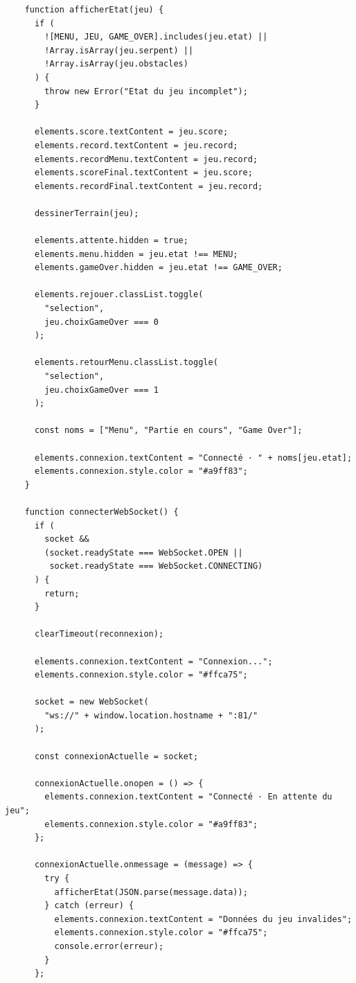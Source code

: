 \documentclass[a4paper,10pt]{article}
\begin{document}
\begin{lstlisting}
    function afficherEtat(jeu) {
      if (
        ![MENU, JEU, GAME_OVER].includes(jeu.etat) ||
        !Array.isArray(jeu.serpent) ||
        !Array.isArray(jeu.obstacles)
      ) {
        throw new Error("Etat du jeu incomplet");
      }

      elements.score.textContent = jeu.score;
      elements.record.textContent = jeu.record;
      elements.recordMenu.textContent = jeu.record;
      elements.scoreFinal.textContent = jeu.score;
      elements.recordFinal.textContent = jeu.record;

      dessinerTerrain(jeu);

      elements.attente.hidden = true;
      elements.menu.hidden = jeu.etat !== MENU;
      elements.gameOver.hidden = jeu.etat !== GAME_OVER;

      elements.rejouer.classList.toggle(
        "selection",
        jeu.choixGameOver === 0
      );

      elements.retourMenu.classList.toggle(
        "selection",
        jeu.choixGameOver === 1
      );

      const noms = ["Menu", "Partie en cours", "Game Over"];

      elements.connexion.textContent = "Connecté · " + noms[jeu.etat];
      elements.connexion.style.color = "#a9ff83";
    }

    function connecterWebSocket() {
      if (
        socket &&
        (socket.readyState === WebSocket.OPEN ||
         socket.readyState === WebSocket.CONNECTING)
      ) {
        return;
      }

      clearTimeout(reconnexion);

      elements.connexion.textContent = "Connexion...";
      elements.connexion.style.color = "#ffca75";

      socket = new WebSocket(
        "ws://" + window.location.hostname + ":81/"
      );

      const connexionActuelle = socket;

      connexionActuelle.onopen = () => {
        elements.connexion.textContent = "Connecté · En attente du jeu";
        elements.connexion.style.color = "#a9ff83";
      };

      connexionActuelle.onmessage = (message) => {
        try {
          afficherEtat(JSON.parse(message.data));
        } catch (erreur) {
          elements.connexion.textContent = "Données du jeu invalides";
          elements.connexion.style.color = "#ffca75";
          console.error(erreur);
        }
      };


\end{lstlisting}
\end{document}
